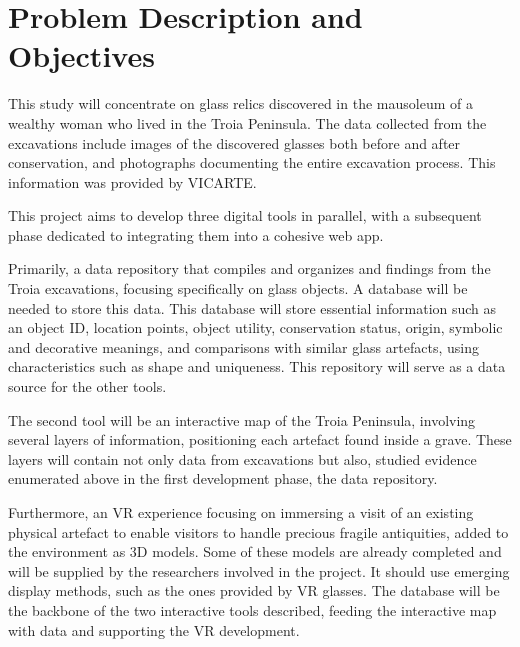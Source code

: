 
\section{Problem Description and Objectives}
\label{sec:problem_description_and_objectives} 
This study will concentrate on glass relics discovered in the mausoleum of a wealthy woman who lived in the Troia Peninsula. The data collected from the excavations include 
images of the discovered glasses both before and after conservation, and photographs documenting the entire excavation process. 
This information was provided by \gls{VICARTE}.

This project aims to develop three digital tools in parallel, with a subsequent phase dedicated to 
integrating them into a cohesive web app.


Primarily, a data repository that compiles and organizes and findings from 
the Troia excavations, focusing specifically on glass objects. A database will be needed to store this data. 
This database will store essential information such as an object ID, location points, object utility,
conservation status, origin, symbolic and decorative meanings, and comparisons with similar glass artefacts, using characteristics such as shape and uniqueness. 
This repository will serve as a data source for the other tools.


The second tool will be an interactive map of the Troia Peninsula, involving several layers of information, positioning each 
artefact found inside a grave. These layers will contain not only data from excavations but also, 
studied evidence enumerated above in the first development phase, the data repository.
 
Furthermore, an \gls{VR} experience focusing on immersing a visit of an existing physical 
artefact to enable visitors to handle precious fragile antiquities, added to the environment as \gls{3D} models. Some of these models are already completed and will be supplied by the researchers involved in the project.
It should use emerging display methods, such as the ones provided by \gls{VR} glasses.
The database will be the backbone of the two interactive tools described, feeding the interactive map with data and supporting the \gls{VR} development.

